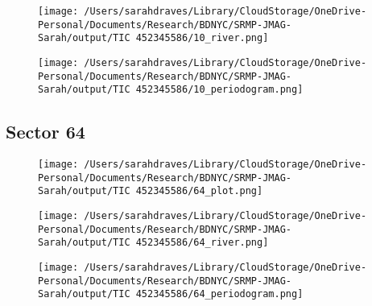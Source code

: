 \documentclass{report}%
\begin{document}
%


\begin{figure}[H]%
\begin{center}%
\centering%
\texttt{[image: /Users/sarahdraves/Library/CloudStorage/OneDrive-Personal/Documents/Research/BDNYC/SRMP-JMAG-Sarah/output/TIC 452345586/10\_river.png]}%
\end{center}%
\end{figure}

%


\begin{figure}[H]%
\begin{center}%
\centering%
\texttt{[image: /Users/sarahdraves/Library/CloudStorage/OneDrive-Personal/Documents/Research/BDNYC/SRMP-JMAG-Sarah/output/TIC 452345586/10\_periodogram.png]}%
\end{center}%
\end{figure}

%
\newpage%
\subsection{Sector 64}%
\label{subsec:TIC45234558664}%


\begin{figure}[H]%
\begin{center}%
\centering%
\texttt{[image: /Users/sarahdraves/Library/CloudStorage/OneDrive-Personal/Documents/Research/BDNYC/SRMP-JMAG-Sarah/output/TIC 452345586/64\_plot.png]}%
\end{center}%
\end{figure}

%


\begin{figure}[H]%
\begin{center}%
\centering%
\texttt{[image: /Users/sarahdraves/Library/CloudStorage/OneDrive-Personal/Documents/Research/BDNYC/SRMP-JMAG-Sarah/output/TIC 452345586/64\_river.png]}%
\end{center}%
\end{figure}

%


\begin{figure}[H]%
\begin{center}%
\centering%
\texttt{[image: /Users/sarahdraves/Library/CloudStorage/OneDrive-Personal/Documents/Research/BDNYC/SRMP-JMAG-Sarah/output/TIC 452345586/64\_periodogram.png]}%
\end{center}%
\end{figure}

%
\end{document}
